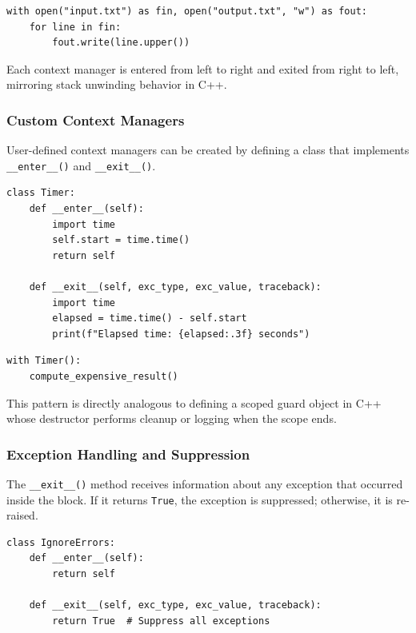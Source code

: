 \begin{verbatim}
with open("input.txt") as fin, open("output.txt", "w") as fout:
    for line in fin:
        fout.write(line.upper())
\end{verbatim}

Each context manager is entered from left to right and exited from right to left, mirroring stack unwinding behavior in C++.

\subsubsection{Custom Context Managers}

User-defined context managers can be created by defining a class that implements \texttt{\_\_enter\_\_\allowbreak()} and \texttt{\_\_exit\_\_\allowbreak()}.

\begin{verbatim}
class Timer:
    def __enter__(self):
        import time
        self.start = time.time()
        return self

    def __exit__(self, exc_type, exc_value, traceback):
        import time
        elapsed = time.time() - self.start
        print(f"Elapsed time: {elapsed:.3f} seconds")
\end{verbatim}

\begin{verbatim}
with Timer():
    compute_expensive_result()
\end{verbatim}

This pattern is directly analogous to defining a scoped guard object in C++ whose destructor performs cleanup or logging when the scope ends.

\subsubsection{Exception Handling and Suppression}

The \texttt{\_\_exit\_\_()} method receives information about any exception that occurred inside the block. If it returns \texttt{True}, the exception is suppressed; otherwise, it is re-raised.

\begin{verbatim}
class IgnoreErrors:
    def __enter__(self):
        return self

    def __exit__(self, exc_type, exc_value, traceback):
        return True  # Suppress all exceptions
\end{verbatim}


